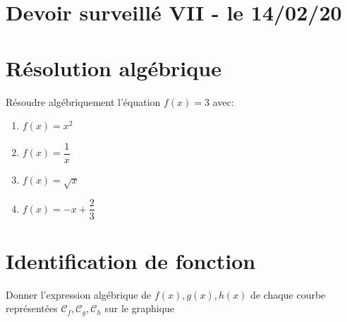 \documentclass[9pt,french]{article}
\begin{document}

\section*{Devoir surveillé VII - le 14/02/20}




\section{Résolution algébrique}

Résoudre algébriquement l'équation $f(x)=3$ avec: 

\begin{enumerate}
\item $f(x)=x^2 $
\item $f(x)=\dfrac{1}{x}$
\item $f(x)=\sqrt{x}$
\item $f(x)=-x+ \dfrac{2}{3} $
\end{enumerate}


\section{Identification de fonction}
Donner l'expression algébrique de $f(x),g(x),h(x)$ de chaque courbe représentées $\mathcal{C}_f, \mathcal{C}_g, \mathcal{C}_h$ sur le graphique \\
\vspace{1cm}
\end{document}

